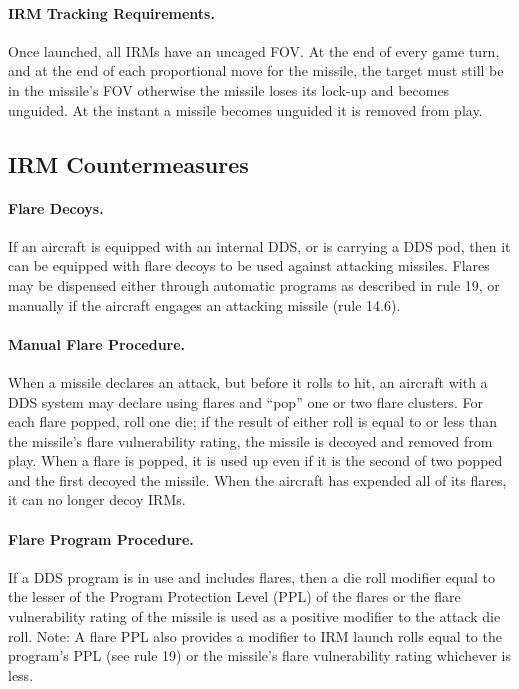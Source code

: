 \paragraph{IRM Tracking Requirements.} Once launched, all IRMs have an uncaged FOV. At the end of every game turn, and at the end of each proportional move for the missile, the target must still be in the missile's FOV otherwise the missile loses its lock-up and becomes unguided. At the instant a missile becomes unguided it is removed from play.

\subsection{IRM Countermeasures}

\paragraph{Flare Decoys.} If an aircraft is equipped with an internal DDS, or is carrying a DDS pod, then it can be equipped with flare decoys to be used against attacking missiles. Flares may be dispensed either through automatic programs as described in rule 19, or manually if the aircraft engages an attacking missile (rule 14.6).

\paragraph{Manual Flare Procedure.} When a missile declares an attack, but before it rolls to hit, an aircraft with a DDS system may declare using flares and “pop” one or two flare clusters. For each flare popped, roll one die; if the result of either roll is equal to or less than the missile's flare vulnerability rating, the missile is decoyed and removed from play. When a flare is popped, it is used up even if it is the second of two popped and the first decoyed the missile. When the aircraft has expended all of its flares, it can no longer decoy IRMs.

\paragraph{Flare Program Procedure.} If a DDS program is in use and includes flares, then a die roll modifier equal to the lesser of the Program Protection Level (PPL) of the flares or the flare vulnerability rating of the missile is used as a positive modifier to the attack die roll. Note: A flare PPL also provides a modifier to IRM launch rolls equal to the program's PPL (see rule 19) or the missile's flare vulnerability rating whichever is less.

